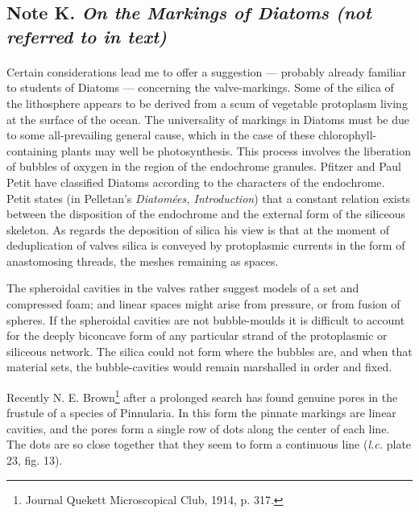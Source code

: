 \documentclass[a4paper, 12pt, oneside, landscape]{article}
\begin{document}
\subsection{Note K. \emph{On the Markings of Diatoms (not referred to in text)}}
\paragraph{}
Certain considerations lead me to offer a suggestion --- probably already familiar to students of Diatoms --- concerning the valve-markings. Some of the silica of the lithosphere appears to be derived from a scum of vegetable protoplasm living at the surface of the ocean. The universality of markings in Diatoms must be due to some all-prevailing general cause, which in the case of these chlorophyll-containing plants may well be photosynthesis. This process involves the liberation of bubbles of oxygen in the region of the endochrome granules. Pfitzer and Paul Petit have classified Diatoms according to the characters of the endochrome. Petit states (in Pelletan's \emph{Diatomées, Introduction}) that a constant relation exists between the disposition of the endochrome and the external form of the siliceous skeleton. As regards the deposition of silica his view is that at the moment of deduplication of valves silica is conveyed by protoplasmic currents in the form of anastomosing threads, the meshes remaining as spaces.

The spheroidal cavities in the valves rather suggest models of a set and compressed foam; and linear spaces might arise from pressure, or from fusion of spheres. If the spheroidal cavities are not bubble-moulds it is difficult to account for the deeply biconcave form of any particular strand of the protoplasmic or siliceous network. The silica could not form where the bubbles are, and when that material sets, the bubble-cavities would remain marshalled in order and fixed.

Recently N. E. Brown\footnote{Journal Quekett Microscopical Club, 1914, p. 317.} after a prolonged search has found genuine pores in the frustule of a species of Pinnularia. In this form the pinnate markings are linear cavities, and the pores form a single row of dots along the center of each line. The dots are so close together that they seem to form a continuous line (\emph{l.c.} plate 23, fig. 13).
\end{document}
